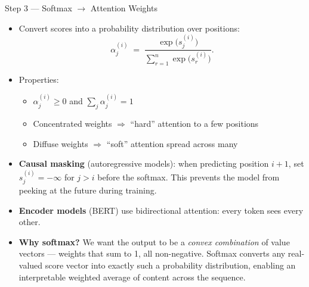 \begin{frame}{Step 3 --- Softmax $\rightarrow$ Attention Weights}
\begin{itemize}
\item Convert scores into a probability distribution over positions:
\[
   \alpha_{j}^{(i)} \;=\; \frac{\exp\bigl(s_{j}^{(i)}\bigr)}{\sum_{r=1}^{n}\exp\bigl(s_{r}^{(i)}\bigr)}.
\]

\medskip
\item Properties:
\begin{itemize}
    \item $\alpha_{j}^{(i)} \ge 0$ and $\sum_{j}\alpha_{j}^{(i)} = 1$
    \item Concentrated weights $\Rightarrow$ ``hard'' attention to a few positions
    \item Diffuse weights $\Rightarrow$ ``soft'' attention spread across many
\end{itemize}

\medskip
\item \textbf{Causal masking} (autoregressive models): when predicting position $i+1$, set $s_{j}^{(i)} = -\infty$ for $j > i$ before the softmax. This prevents the model from peeking at the future during training.

\medskip
\item \textbf{Encoder models} (BERT) use bidirectional attention: every token sees every other.

\medskip
\item \textbf{Why softmax?} We want the output to be a \emph{convex combination} of value vectors --- weights that sum to 1, all non-negative. Softmax converts any real-valued score vector into exactly such a probability distribution, enabling an interpretable weighted average of content across the sequence.
\end{itemize}
\end{frame}

